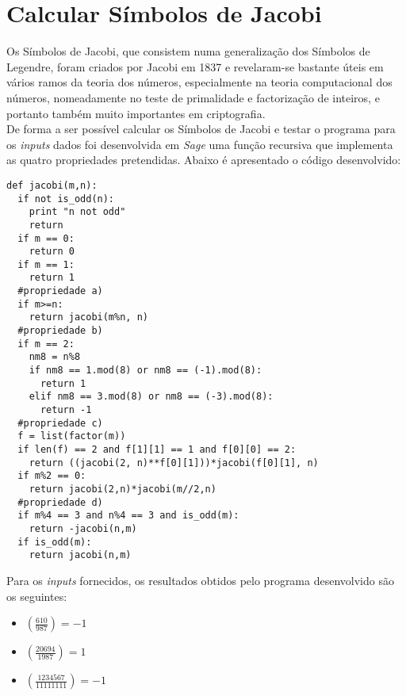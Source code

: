 \section{Calcular Símbolos de Jacobi}
Os Símbolos de Jacobi, que consistem numa generalização dos Símbolos de Legendre, foram criados por Jacobi em 1837 e revelaram-se bastante úteis em vários ramos da teoria dos números, especialmente na teoria computacional dos números, nomeadamente no teste de primalidade e factorização de inteiros, e portanto também muito importantes em criptografia.\\
De forma a ser possível calcular os Símbolos de Jacobi e testar o programa para os \textit{inputs} dados foi desenvolvida em \textit{Sage} uma função recursiva que implementa as quatro propriedades pretendidas. Abaixo é apresentado o código desenvolvido:
\begin{lstlisting}[style=sage]
def jacobi(m,n):
  if not is_odd(n):
    print "n not odd"
    return
  if m == 0:
    return 0
  if m == 1:
    return 1
  #propriedade a)
  if m>=n:
    return jacobi(m%n, n)
  #propriedade b)
  if m == 2:
    nm8 = n%8
    if nm8 == 1.mod(8) or nm8 == (-1).mod(8):
      return 1
    elif nm8 == 3.mod(8) or nm8 == (-3).mod(8):
      return -1
  #propriedade c)
  f = list(factor(m))
  if len(f) == 2 and f[1][1] == 1 and f[0][0] == 2:
    return ((jacobi(2, n)**f[0][1]))*jacobi(f[0][1], n)
  if m%2 == 0:
    return jacobi(2,n)*jacobi(m//2,n)
  #propriedade d)
  if m%4 == 3 and n%4 == 3 and is_odd(m):
    return -jacobi(n,m)
  if is_odd(m):
    return jacobi(n,m)
\end{lstlisting}
Para os \textit{inputs} fornecidos, os resultados obtidos pelo programa desenvolvido são os seguintes:
\begin{itemize}
  \item $(\frac{610}{987}) = -1$
  \item $(\frac{20694}{1987}) = 1$
  \item $(\frac{1234567}{11111111}) = -1$
\end{itemize}
